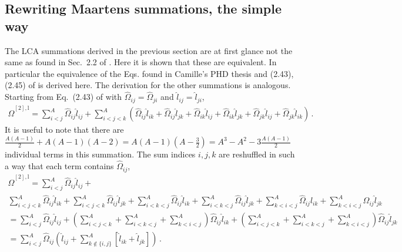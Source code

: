 \documentclass[10pt]{article}
\begin{document}
\subsection{Rewriting Maartens summations, the simple way}
The LCA summations derived in the previous section are at first glance not the same as found in Sec.~2.2 of \cite{phdthesis_mvanhalst}.
Here it is shown that these are equivalent.
In particular the equivalence of the Eqs. found in Camille's PHD thesis and (2.43),(2.45) of \cite{phdthesis_mvanhalst} is derived here. 
The derivation for the other summations is analogous.
Starting from Eq.~(2.43) of \cite{phdthesis_mvanhalst} with $\widehat{\Omega}_{ij} = \widehat{\Omega}_{ji}$ and $\hat{l}_{ij} = \hat{l}_{ji}$,
\begin{align}
	\widehat{\Omega}^{[2],\text{l}} = \sum_{i<j}^{A} \widehat{\Omega}_{ij} \hat{l}_{ij} + 
	\sum_{i<j<k}^{A}
	\left(	
	\widehat{\Omega}_{ij} \hat{l}_{ik} + 
	\widehat{\Omega}_{ij} \hat{l}_{jk} +
	\widehat{\Omega}_{ik} \hat{l}_{ij} +
	\widehat{\Omega}_{ik} \hat{l}_{jk} +
	\widehat{\Omega}_{jk} \hat{l}_{ij} +
	\widehat{\Omega}_{jk} \hat{l}_{ik} 
	\right) \, .
	\label{eq:two_body_op_correlation_linear_Maarten}
\end{align}
It is useful to note that there are $\frac{A(A-1)}{2} + A(A-1)(A-2) = A(A-1)(A-\frac{3}{2}) = A^{3} - A^{2} - 3\frac{A(A-1)}{2}$ individual terms in this summation. 
The sum indices $i,j,k$ are reshuffled in such a way that each term contains $\widehat{\Omega}_{ij}$,
\begin{multline}
	\widehat{\Omega}^{[2],\text{l}} = \sum_{i<j}^{A} \widehat{\Omega}_{ij} \hat{l}_{ij} + \\
	\sum_{i<j<k}^{A} \widehat{\Omega}_{ij} \hat{l}_{ik} + 
	\sum_{i<j<k}^{A} \widehat{\Omega}_{ij} \hat{l}_{jk} +
	\sum_{i<k<j}^{A} \widehat{\Omega}_{ij} \hat{l}_{ik} +
	\sum_{i<k<j}^{A} \widehat{\Omega}_{ij} \hat{l}_{jk} +
	\sum_{k<i<j}^{A} \widehat{\Omega}_{ij} \hat{l}_{ik} +
	\sum_{k<i<j}^{A} \widehat{\Omega}_{ij} \hat{l}_{jk} \\
	= \sum_{i<j}^{A} \widehat{\Omega}_{ij} \hat{l}_{ij} + 
	\left( \sum_{i<j<k}^{A} + \sum_{i<k<j}^{A} + \sum_{k<i<j}^{A} \right) \widehat{\Omega}_{ij} \hat{l}_{ik} + 
	\left( \sum_{i<j<k}^{A} + \sum_{i<k<j}^{A} + \sum_{k<i<j}^{A} \right) \widehat{\Omega}_{ij} \hat{l}_{jk} \\
	= \sum_{i<j}^{A} \widehat{\Omega}_{ij}  \left( \hat{l}_{ij} + 
	\sum_{k \notin\{i,j\}}^{A}
	\left[ 
	\hat{l}_{ik} + \hat{l}_{jk} 
	\right]	
	\right) \, .
	\label{eq:two_body_op_correlation_linear_intuitive}
\end{multline}
\end{document}
